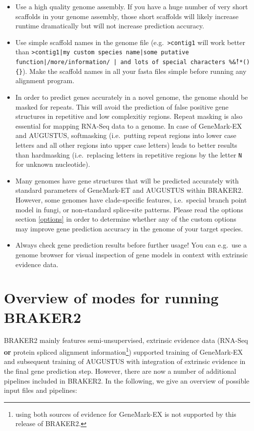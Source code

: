 \documentclass[a4paper,10pt]{report}
\begin{document}
\begin{itemize}
 \item Use a high quality genome assembly. If you have a huge number of very short scaffolds in your genome assembly, those short scaffolds will likely increase runtime dramatically but will not increase prediction accuracy. 
 \item Use simple scaffold names in the genome file (e.g.~\texttt{>contig1} will work better than \texttt{>contig1|my custom species name|some putative function|/more/information/ | and lots of special characters \%\^\&!*()\{\}}). Make the scaffold names in all your fasta files simple before running any alignment program.
 \item In order to predict genes accurately in a novel genome, the genome should be masked for repeats. This will avoid the prediction of false positive gene structures in repetitive and low complexitiy regions. Repeat masking is also essential for mapping RNA-Seq data to a genome. In case of GeneMark-EX and AUGUSTUS, softmasking (i.e.~putting repeat regions into lower case letters and all other regions into upper case letters) leads to better results than hardmasking (i.e.~replacing letters in repetitive regions by the letter \texttt{N} for unknown nucleotide).
 
 \item Many genomes have gene structures that will be predicted accurately with standard parameters of GeneMark-ET and AUGUSTUS within BRAKER2. However, some genomes have clade-specific features, i.e.~special branch point model in fungi, or non-standard splice-site patterns. Please read the options section \ref{options} in order to determine whether any of the custom options may improve gene prediction accuracy in the genome of your target species.
 
 \item Always check gene prediction results before further usage! You can e.g.~use a genome browser for visual inspection of gene models in context with extrinsic evidence data.
\end{itemize}

\section{Overview of modes for running BRAKER2}

BRAKER2 mainly features semi-unsupervised, extrinsic evidence data (RNA-Seq \textbf{or} protein spliced alignment information\footnote{using both sources of evidence for GeneMark-EX is not supported by this release of BRAKER2.}) supported training of GeneMark-EX and subsequent training of AUGUSTUS with integration of extrinsic evidence in the final gene prediction step. However, there are now a number of additional pipelines included in BRAKER2. In the following, we give an overview of possible input files and pipelines:
\end{document}
